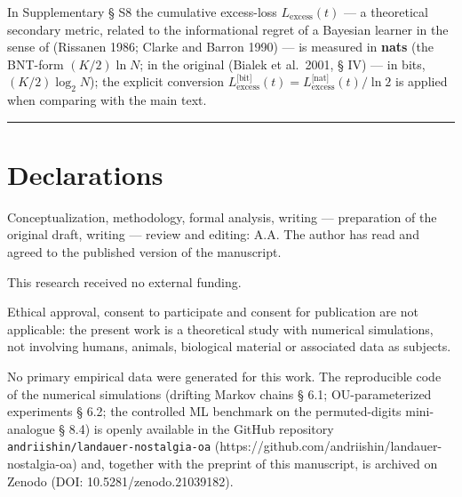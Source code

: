 \documentclass[pdflatex,sn-mathphys-ay]{sn-jnl}
\begin{document}
In Supplementary § S8 the cumulative excess-loss \(L_{\text{excess}}(t)\) --- a theoretical secondary metric, related to the informational regret of a Bayesian learner in the sense of (Rissanen 1986; Clarke and Barron 1990) --- is measured in \textbf{nats} (the BNT-form \((K/2)\ln N\); in the original (Bialek et al.~2001, § IV) --- in bits, \((K/2)\log_2 N\)); the explicit conversion \(L_{\text{excess}}^{\text{[bit]}}(t) = L_{\text{excess}}^{\text{[nat]}}(t)/\ln 2\) is applied when comparing with the main text.



\begin{center}\rule{0.5\linewidth}{0.5pt}\end{center}



\backmatter

\section*{Declarations}

Conceptualization, methodology, formal analysis, writing --- preparation of the original draft, writing --- review and editing: A.A. The author has read and agreed to the published version of the manuscript.

This research received no external funding.

Ethical approval, consent to participate and consent for publication are not applicable: the present work is a theoretical study with numerical simulations, not involving humans, animals, biological material or associated data as subjects.

No primary empirical data were generated for this work. The reproducible code of the numerical simulations (drifting Markov chains § 6.1; OU-parameterized experiments § 6.2; the controlled ML benchmark on the permuted-digits mini-analogue § 8.4) is openly available in the GitHub repository \texttt{andriishin/landauer-nostalgia-oa} (https://github.com/andriishin/landauer-nostalgia-oa) and, together with the preprint of this manuscript, is archived on Zenodo (DOI: 10.5281/zenodo.21039182).
\end{document}
